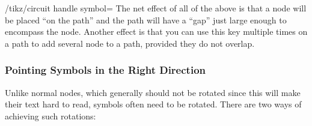 \begin{key}{/tikz/circuit handle symbol=}
  The net effect of all of the above is that a node will be placed
  ``on the path'' and the path will have a ``gap'' just large enough
  to encompass the node. Another effect is that you can use this key
  multiple times on a path to add several node to a path, provided
  they do not overlap.
\begin{codeexample}[]
\end{codeexample}
\begin{codeexample}[]
\end{codeexample}
\end{key}



\subsubsection{Pointing Symbols in the Right Direction}

Unlike normal nodes, which generally should not be rotated since this
will make their text hard to read, symbols often need to be
rotated. There are two ways of achieving such rotations:

